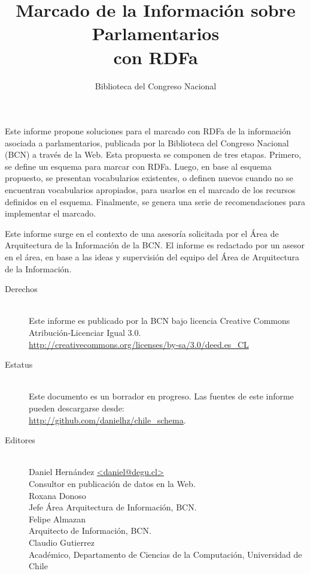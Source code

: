 \documentclass[letterpaper,titlepage]{article}
\title{Marcado de la Información sobre Parlamentarios \\ con RDFa}
\author{Biblioteca del Congreso Nacional}
\begin{document}
\maketitle

\thispagestyle{empty}

\abstract

Este informe propone soluciones para el marcado con RDFa de la
información asociada a parlamentarios, publicada por la Biblioteca del
Congreso Nacional (BCN) a través de la Web. Esta propuesta se
componen de tres etapas. Primero, se define un esquema para marcar
con RDFa. Luego, en base al esquema propuesto, se presentan
vocabularios existentes, o definen nuevos cuando no se encuentran
vocabularios apropiados, para usarlos en el marcado de los recursos
definidos en el esquema. Finalmente, se genera una serie de
recomendaciones para implementar el marcado. \medskip

Este informe surge en el contexto de una asesoría solicitada por el
Área de Arquitectura de la Información de la BCN. El informe es
redactado por un asesor en el área, en base a las
ideas y supervisión del equipo del Área de Arquitectura de la
Información.

\newpage

\thispagestyle{empty}

\null

\vfill

\begin{description}
\item[Derechos] \hfill \\
  Este informe es publicado por la BCN
  bajo licencia Creative Commons Atribución-Licenciar Igual 3.0. \\
  \url{http://creativecommons.org/licenses/by-sa/3.0/deed.es_CL}
\item[Estatus] \hfill \\
  Este documento es un borrador en progreso.
  Las fuentes de este informe pueden descargarse desde: \\
  \url{http://github.com/danielhz/chile_schema}.
\item[Editores] \hfill \\
  {\sf Daniel Hernández} \url{<daniel@degu.cl>} \\
  {Consultor en publicación de datos en la Web.} \\
  {\sf Roxana Donoso} \\
  {Jefe Área Arquitectura de Información, BCN.} \\
  {\sf Felipe Almazan} \\
  {Arquitecto de Información, BCN.} \\
  {\sf Claudio Gutierrez} \\
  {Académico, Departamento de Ciencias de la Computación, Universidad de Chile}
\end{description}
\end{document}
